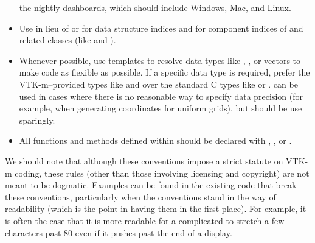 \begin{itemize}
  the nightly dashboards, which should include Windows, Mac, and Linux.
\item Use  in lieu of  or  for data
  structure indices and  for component indices of
   and related classes (like  and
  ).
\item Whenever possible, use templates to resolve data types like
  , , or vectors to make code as flexible
  as possible. If a specific data type is required, prefer the
  VTK-m--provided types like  and  over the
  standard C types like  or
  .  can be used in cases where there
  is no reasonable way to specify data precision (for example, when
  generating coordinates for uniform grids), but should be use sparingly.
\item All functions and methods defined within \VTKm should be
  declared with \vtkmcontexport, \vtkmexecexport, or \vtkmexeccontexport.
\end{itemize}

We should note that although these conventions impose a strict statute on
VTK-m coding, these rules (other than those involving licensing and
copyright) are not meant to be dogmatic. Examples can be found in the
existing code that break these conventions, particularly when the
conventions stand in the way of readability (which is the point in having
them in the first place). For example, it is often the case that it is more
readable for a complicated  to stretch a few characters
past 80 even if it pushes past the end of a display.
